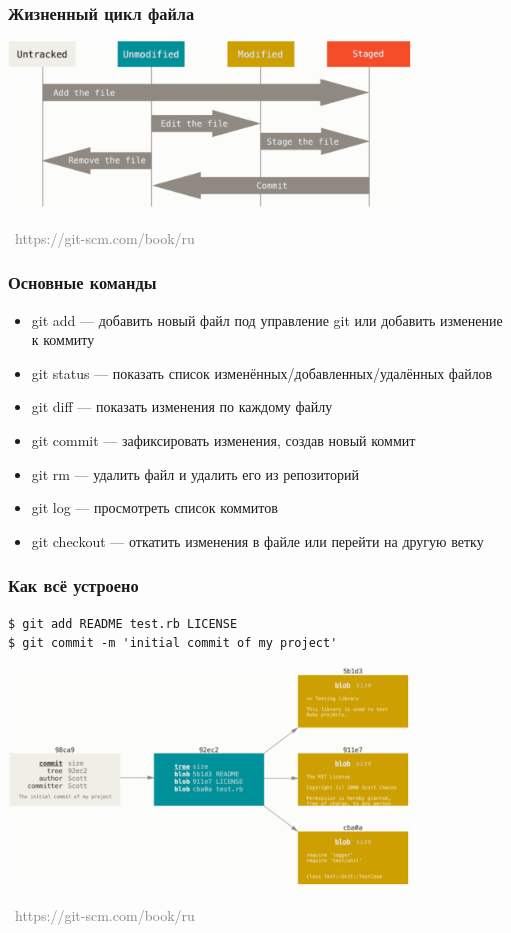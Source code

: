 \documentclass[xetex,mathserif,serif]{beamer}
\newcommand{\attribution}[1] {
	\vspace{-5mm}\begin{flushright}\begin{scriptsize}\textcolor{gray}{\textcopyright\, #1}\end{scriptsize}\end{flushright}
}
\begin{document}
	\begin{frame}
		\frametitle{Жизненный цикл файла}
		\begin{center}
			\includegraphics[width=0.8\textwidth]{fileLifeCycle.png}
			\attribution{https://git-scm.com/book/ru}
		\end{center}
	\end{frame}

	\begin{frame}
		\frametitle{Основные команды}
		\begin{itemize}
			\item git add --- добавить новый файл под управление git или добавить изменение к коммиту
			\item git status --- показать список изменённых/добавленных/удалённых файлов
			\item git diff --- показать изменения по каждому файлу
			\item git commit --- зафиксировать изменения, создав новый коммит
			\item git rm --- удалить файл и удалить его из репозиторий
			\item git log --- просмотреть список коммитов
			\item git checkout --- откатить изменения в файле или перейти на другую ветку
		\end{itemize}
	\end{frame}

	\begin{frame}[fragile]
		\frametitle{Как всё устроено}
		\begin{verbatim}
$ git add README test.rb LICENSE
$ git commit -m 'initial commit of my project'
		\end{verbatim}
		\begin{center}
			\includegraphics[width=0.8\textwidth]{blobs.png}
			\attribution{https://git-scm.com/book/ru}
		\end{center}
	\end{frame}
\end{document}
